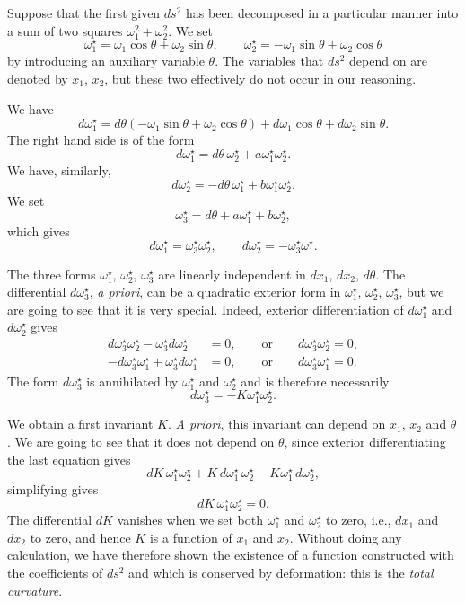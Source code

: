\documentclass[leqno,11pt]{article}
\theoremstyle{shape1}
\theoremstyle{shape0}
\theoremstyle{shape2}
\theoremstyle{definition}
\begin{document}
Suppose that the first given $ds^{2}$ has been decomposed in a particular manner into a sum of two squares $\omega_{1}^{2}+\omega_{2}^{2}$. We set
\[
\omega_{1}^{\star}=\omega_{1}\cos\theta+\omega_{2}\sin\theta,\qquad\omega_{2}^{\star}=-\omega_{1}\sin\theta+\omega_{2}\cos\theta
\]
by introducing an auxiliary variable $\theta$. The variables that $ds^{2}$ depend on are denoted by $x_{1}$, $x_{2}$, but these two effectively do not occur in our reasoning.

We have
\[
d\omega_{1}^{\star}=d\theta(-\omega_{1}\sin\theta+\omega_{2}\cos\theta)+d\omega_{1}\cos\theta+d\omega_{2}\sin\theta.
\]
The right hand side is of the form
\[
d\omega_{1}^{\star}=d\theta\,\omega_{2}^{\star}+a\omega_{1}^{\star}\omega_{2}^{\star}.
\]
We have, similarly,
\[
d\omega_{2}^{\star}=-d\theta\,\omega_{1}^{\star}+b\omega_{1}^{\star}\omega_{2}^{\star}.
\]
We set
\[
\omega_{3}^{\star}=d\theta+a\omega_{1}^{\star}+b\omega_{2}^{\star},
\]
which gives
\[
d\omega_{1}^{\star}=\omega_{3}^{\star}\omega_{2}^{\star},\qquad d\omega_{2}^{\star}=-\omega_{3}^{\star}\omega_{1}^{\star}.
\]

The three forms $\omega_{1}^{\star}$, $\omega_{2}^{\star}$, $\omega_{3}^{\star}$ are linearly independent in $dx_{1}$, $dx_{2}$, $d\theta$. The differential $d\omega_{3}^{\star}$, \emph{a priori}, can be a quadratic exterior form in $\omega_{1}^{\star}$, $\omega_{2}^{\star}$, $\omega_{3}^{\star}$, but we are going to see that it is very special. Indeed, exterior differentiation of $d\omega_{1}^{\star}$ and $d\omega_{2}^{\star}$ gives
\begin{align*}
  d\omega_{3}^{\star}\omega_{2}^{\star}-\omega_{3}^{\star}d\omega_{2}^{\star}&=0,\qquad\text{or}\qquad d\omega_{3}^{\star}\omega_{2}^{\star}=0,\\
 -d\omega_{3}^{\star}\omega_{1}^{\star}+\omega_{3}^{\star}d\omega_{1}^{\star}&=0,\qquad\text{or}\qquad d\omega_{3}^{\star}\omega_{1}^{\star}=0.
\end{align*}
The form $d\omega_{3}^{\star}$ is annihilated by $\omega_{1}^{\star}$ and $\omega_{2}^{\star}$ and is therefore necessarily
\[
d\omega_{3}^{\star}=-K\omega_{1}^{\star}\omega_{2}^{\star}.
\]

We obtain a first invariant $K$. \emph{A priori}, this invariant can depend on $x_{1}$, $x_{2}$ and $\theta$. We are going to see that it does not depend on $\theta$, since exterior differentiating the last equation gives
\[
dK\,\omega_{1}^{\star}\omega_{2}^{\star}+K\,d\omega_{1}^{\star}\,\omega_{2}^{\star}-K\omega_{1}^{\star}\,d\omega_{2}^{\star},
\]
simplifying gives
\[
dK\,\omega_{1}^{\star}\omega_{2}^{\star}=0.
\]
The differential $dK$ vanishes when we set both $\omega_{1}^{\star}$ and $\omega_{2}^{\star}$ to zero, i.e., $dx_{1}$ and $dx_{2}$ to zero, and hence $K$ is a function of $x_{1}$ and $x_{2}$. Without doing any calculation, we have therefore shown the existence of a function constructed with the coefficients of $ds^{2}$ and which is conserved by deformation: this is the \emph{total curvature}.
\end{document}
